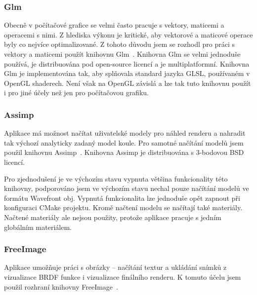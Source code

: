 \documentclass[czech,master]{diploma}
\begin{document}
\subsubsection*{Glm}
Obecně v počítačové grafice se velmi často pracuje s vektory, maticemi a operacemi s nimi. Z hlediska výkonu je kritické, aby vektorové a maticové operace byly co nejvíce optimalizované. Z tohoto důvodu jsem se rozhodl pro práci s vektory a maticemi použít knihovnu Glm~\cite{sourceGlm}. Knihovna Glm se velmi jednoduše používá, je distribuována pod open-source licencí a je multiplatformní. Knihovna Glm je implementována tak, aby splňovala standard jazyka GLSL, používaném v OpenGL shaderech. Není však na OpenGL závislá a lze tak tuto knihovnu použít i pro jiné účely než jen pro počítačovou grafiku.

\subsubsection*{Assimp}
Aplikace má možnost načítat uživatelské modely pro náhled renderu a nahradit tak výchozí analyticky zadaný model koule. Pro samotné načítání modelů jsem použil knihovnu Assimp~\cite{sourceAssimp}. Knihovna Assimp je distribuována s 3-bodovou BSD licencí.\par
Pro zjednodušení je ve výchozím stavu vypnuta většina funkcionality této knihovny, podporováno jsem ve výchozím stavu nechal pouze načítání modelů ve formátu Wavefront obj. Vypnutá funkcionalita lze jednoduše opět zapnout při konfiguraci CMake projektu. Kromě načtení modelu se načítají také materiály. Načtené materiály ale nejsou použity, protože aplikace pracuje s jedním globálním materiálem.

\subsubsection*{FreeImage}
Aplikace umožňuje práci s obrázky -- načítání textur a ukládání snímků z vizualizace BRDF funkce i vizualizace finálního renderu. K tomuto účelu jsem použil rozhraní knihovny FreeImage~\cite{sourceFreeImage}.
\end{document}
